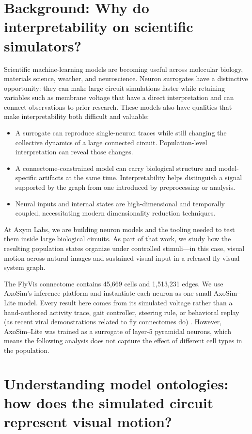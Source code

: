 \documentclass[11pt]{article}
\begin{document}
\section{Background: Why do interpretability on scientific simulators?}

Scientific machine-learning models are becoming useful across molecular biology, materials science, weather, and neuroscience. Neuron surrogates have a distinctive opportunity: they can make large circuit simulations faster while retaining variables such as membrane voltage that have a direct interpretation and can connect observations to prior research. These models also have qualities that make interpretability both difficult and valuable:

\begin{itemize}
\tightlist
\item A surrogate can reproduce single-neuron traces while still changing the collective dynamics of a large connected circuit. Population-level interpretation can reveal those changes.
\item A connectome-constrained model can carry biological structure and model-specific artifacts at the same time. Interpretability helps distinguish a signal supported by the graph from one introduced by preprocessing or analysis.
\item Neural inputs and internal states are high-dimensional and temporally coupled, necessitating modern dimensionality reduction techniques.
\end{itemize}

At Axym Labs, we are building neuron models and the tooling needed to test them inside large biological circuits. As part of that work, we study how the resulting population states organize under controlled stimuli---in this case, visual motion across natural images and sustained visual input in a released fly visual-system graph.

The FlyVis connectome contains 45,669 cells and 1,513,231 edges. We use AxoSim's inference platform and instantiate each neuron as one small AxoSim--Lite model. Every result here comes from its simulated voltage rather than a hand-authored activity trace, gait controller, steering rule, or behavioral replay (as recent viral demonstrations related to fly connectomes do) \cite{flybraindemo}. However, AxoSim--Lite was trained as a surrogate of layer-5 pyramidal neurons, which means the following analysis does not capture the effect of different cell types in the population.

\section{Understanding model ontologies: how does the simulated circuit represent visual motion?}
\end{document}
